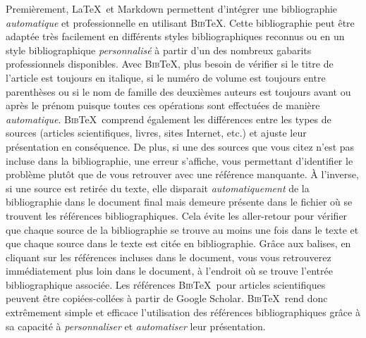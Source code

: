 \documentclass[
  letterpaper,
]{scrbook}
\begin{document}
Premièrement, \LaTeX~et Markdown permettent d'intégrer une bibliographie
\emph{automatique} et professionnelle en utilisant \textsc{Bib}\TeX.
Cette bibliographie peut être adaptée très facilement en différents
styles bibliographiques reconnus ou en un style bibliographique
\emph{personnalisé} à partir d'un des nombreux gabarits professionnels
disponibles. Avec \textsc{Bib}\TeX, plus besoin de vérifier si le titre
de l'article est toujours en italique, si le numéro de volume est
toujours entre parenthèses ou si le nom de famille des deuxièmes auteurs
est toujours avant ou après le prénom puisque toutes ces opérations sont
effectuées de manière \emph{automatique}. \textsc{Bib}\TeX~comprend
également les différences entre les types de sources (articles
scientifiques, livres, sites Internet, etc.) et ajuste leur présentation
en conséquence. De plus, si une des sources que vous citez n'est pas
incluse dans la bibliographie, une erreur s'affiche, vous permettant
d'identifier le problème plutôt que de vous retrouver avec une référence
manquante. À l'inverse, si une source est retirée du texte, elle
disparait \emph{automatiquement} de la bibliographie dans le document
final mais demeure présente dans le fichier où se trouvent les
références bibliographiques. Cela évite les aller-retour pour vérifier
que chaque source de la bibliographie se trouve au moins une fois dans
le texte et que chaque source dans le texte est citée en bibliographie.
Grâce aux balises, en cliquant sur les références incluses dans le
document, vous vous retrouverez immédiatement plus loin dans le
document, à l'endroit où se trouve l'entrée bibliographique associée.
Les références \textsc{Bib}\TeX~pour articles scientifiques peuvent être
copiées-collées à partir de Google Scholar. \textsc{Bib}\TeX~rend donc
extrêmement simple et efficace l'utilisation des références
bibliographiques grâce à sa capacité à \emph{personnaliser} et
\emph{automatiser} leur présentation.
\end{document}
